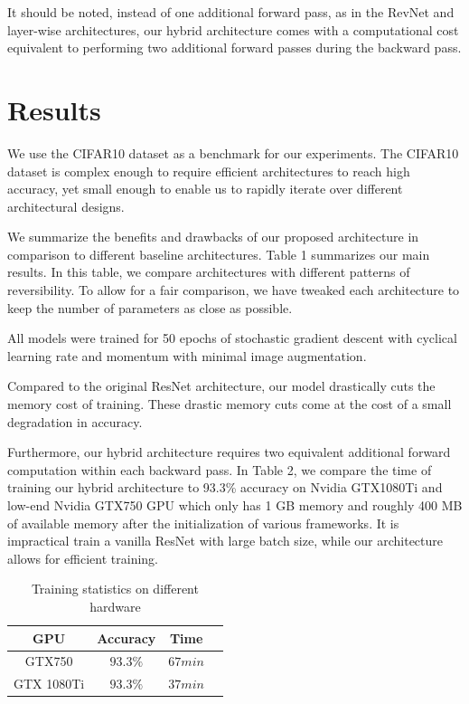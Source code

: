 \documentclass[10pt,twocolumn,letterpaper]{article}
\begin{document}
It should be noted, instead of one additional forward pass, as in the RevNet and layer-wise architectures, our hybrid architecture comes with a computational cost equivalent to performing two additional forward passes during the backward pass. 

\section{Results} 
We use the CIFAR10 dataset as a benchmark for our experiments. The CIFAR10 dataset is complex enough to require efficient architectures to reach high accuracy, yet small enough to enable us to rapidly iterate over different architectural designs. 

We summarize the benefits and drawbacks of our proposed architecture in comparison to different baseline architectures. Table 1 summarizes our main results. In this table, we compare architectures with different patterns of reversibility. To allow for a fair comparison, we have tweaked each architecture to keep the number of parameters as close as possible.

All models were trained for 50 epochs of stochastic gradient descent with cyclical learning rate and momentum with minimal image augmentation.

Compared to the original ResNet architecture, our model drastically cuts the memory cost of training. These drastic memory cuts come at the cost of a small degradation in accuracy.

Furthermore, our hybrid architecture requires two equivalent additional forward computation within each backward pass. In Table 2, we compare the time of training our hybrid architecture to 93.3\% accuracy on Nvidia GTX1080Ti and low-end Nvidia GTX750 GPU which only has 1 GB memory and roughly 400 MB of available memory after the initialization of various frameworks. It is impractical train a vanilla ResNet with large batch size, while our architecture allows for efficient training.
\begin{table}[h]
\centering
\caption{Training statistics on different hardware}
\begin{tabular}{ c c c c}	
 GPU & Accuracy  & Time \\
\hline			
GTX750     & $93.3\%$  & $67 min$    \\
GTX 1080Ti & $93.3\%$  & $37min$  \\
\hline
\end{tabular}

\end{table}
\end{document}
